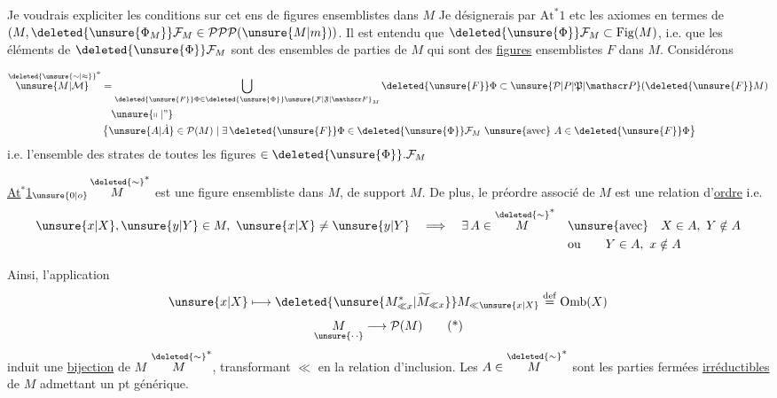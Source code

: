 Je voudrais expliciter les conditions sur cet ens de figures ensemblistes dans $M$ Je désignerais par $\mathrm{At}^{*}1$ etc les axiomes en termes de $(M,\deleted{\unsure{\Phi_M}}\mathcal F_M\in\mathcal P\mathcal P\mathcal P(\unsure{M|m}))$.
 Il est entendu que $\deleted{\unsure{\Phi}}\mathcal F_M\subset\mathrm{Fig}(M)$, i.e.  que les éléments de $\deleted{\unsure{\Phi}}\mathcal F_M$ sont des ensembles de parties de $M$ qui sont des \uline{figures} ensemblistes $F$ dans $M$.   Considérons

\[
\begin{aligned}
 \overset{\deleted{\unsure{\sim|\approx}}}{\unsure{M|\mathcal M}}^{*}
  &=\bigcup_{\deleted{\unsure{F}}\Phi\in\deleted{\unsure{\Phi}}\unsure{\mathcal F|\mathfrak F|\mathscr F}_M}
       \deleted{\unsure{F}}\Phi\subset\unsure{\mathcal P|P|\mathfrak P|\mathscr P}(\deleted{\unsure{F}}M)\\
 &\quad\unsure{\shortparallel|\text{''}}\\
 &\left\{\unsure{A|\dot A}\in\mathcal P(M)\mid\exists\,\deleted{\unsure{F}}\Phi\in\deleted{\unsure{\Phi}}\mathcal F_M
       \ \text{\unsure{avec}}\ A\in\deleted{\unsure{F}}\Phi\right\}
\end{aligned}
\]
i.e. l'ensemble des strates de toutes les figures $\in\deleted{\unsure{\Phi}}.\mathcal F_M$

\uline{At$^{*}$1}$_{\unsure{0|o}}$\quad $\overset{\deleted{\sim}}{M}^{*}$ est une figure ensembliste
\margin{\rule{0.45pt}{3.5\baselineskip}}
dans $M$, de support $M$. De plus, le préordre associé de $M$  est une relation d'\uline{ordre} i.e.
\[
\begin{aligned}
 \unsure{x|X},\unsure{y|Y}\in M,\ \unsure{x|X}\neq\unsure{y|Y}\quad\Longrightarrow\quad \exists\, A\in\overset{\deleted{\sim}}{M}^{*}
 &\quad\text{\unsure{avec}}\quad X\in A,\ Y\notin A\\
 &\quad\text{ou}\qquad Y\in A,\ x\notin A
\end{aligned}
\]

Ainsi, l'application
\[
 \unsure{x|X}\longmapsto \deleted{\unsure{M^{*}_{\ll x}|\widetilde M_{\ll x}}}M_{\ll\unsure{x|X}}
 \overset{\mathrm{def}}{=}\mathrm{Omb}(X)
\]
\[
 \underset{\unsure{\cdot\,\cdot}}{M}\longrightarrow\mathcal P(M)\tag*{(*)}
\]
induit une \uline{bijection} de $M$  $\overset{\deleted{\sim}}{M}^{*}$, transformant $\ll$ en la relation d'inclusion.
Les $A\in\overset{\deleted{\sim}}{M}^{*}$ sont les parties fermées \uline{irréductibles} de $M$ admettant un pt générique.

